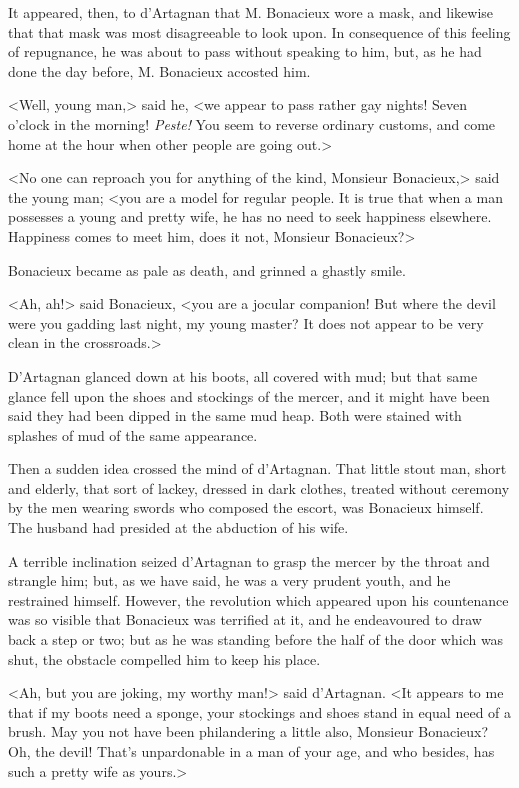 It appeared, then, to d'Artagnan that M. Bonacieux wore a mask, and likewise that that mask was most disagreeable to look upon. In consequence of this feeling of repugnance, he was about to pass without speaking to him, but, as he had done the day before, M. Bonacieux accosted him. 

<Well, young man,> said he, <we appear to pass rather gay nights! Seven o'clock in the morning! \textit{Peste!} You seem to reverse ordinary customs, and come home at the hour when other people are going out.> 

<No one can reproach you for anything of the kind, Monsieur Bonacieux,> said the young man; <you are a model for regular people. It is true that when a man possesses a young and pretty wife, he has no need to seek happiness elsewhere. Happiness comes to meet him, does it not, Monsieur Bonacieux?> 

Bonacieux became as pale as death, and grinned a ghastly smile. 

<Ah, ah!> said Bonacieux, <you are a jocular companion! But where the devil were you gadding last night, my young master? It does not appear to be very clean in the crossroads.> 

D'Artagnan glanced down at his boots, all covered with mud; but that same glance fell upon the shoes and stockings of the mercer, and it might have been said they had been dipped in the same mud heap. Both were stained with splashes of mud of the same appearance. 

Then a sudden idea crossed the mind of d'Artagnan. That little stout man, short and elderly, that sort of lackey, dressed in dark clothes, treated without ceremony by the men wearing swords who composed the escort, was Bonacieux himself. The husband had presided at the abduction of his wife. 

A terrible inclination seized d'Artagnan to grasp the mercer by the throat and strangle him; but, as we have said, he was a very prudent youth, and he restrained himself. However, the revolution which appeared upon his countenance was so visible that Bonacieux was terrified at it, and he endeavoured to draw back a step or two; but as he was standing before the half of the door which was shut, the obstacle compelled him to keep his place. 

<Ah, but you are joking, my worthy man!> said d'Artagnan. <It appears to me that if my boots need a sponge, your stockings and shoes stand in equal need of a brush. May you not have been philandering a little also, Monsieur Bonacieux? Oh, the devil! That's unpardonable in a man of your age, and who besides, has such a pretty wife as yours.> 

